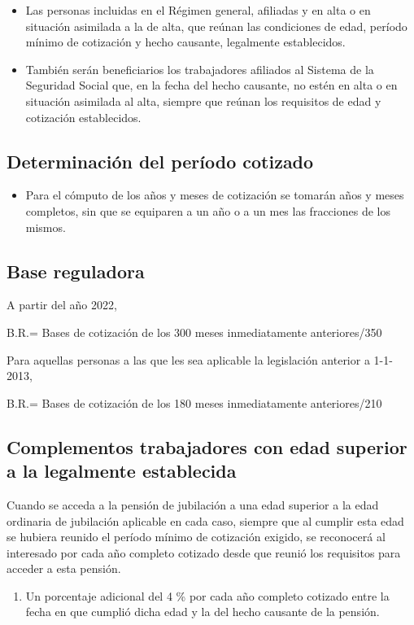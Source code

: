 \documentclass{article}
\begin{document}
	\begin{itemize}
		\item Las personas incluidas en el Régimen general, afiliadas y en alta o en situación asimilada a la de alta, que reúnan las condiciones de edad, período mínimo de cotización y hecho causante, legalmente establecidos.
		\item También serán beneficiarios los trabajadores afiliados al Sistema de la Seguridad Social que, en la fecha del hecho causante, no estén en alta o en situación asimilada al alta, siempre que reúnan los requisitos de edad y cotización establecidos.
	\end{itemize}
	
	\subsection*{Determinación del período cotizado}
	
	\begin{itemize}
		\item Para el cómputo de los años y meses de cotización se tomarán años y meses completos, sin que se equiparen a un año o a un mes las fracciones de los mismos.
	\end{itemize}
	
	\subsection*{Base reguladora}
	
	A partir del año 2022,
	
	B.R.= Bases de cotización de los 300 meses inmediatamente anteriores/350
	
	Para aquellas personas a las que les sea aplicable la legislación anterior a 1-1-2013,
	
	B.R.= Bases de cotización de los 180 meses inmediatamente anteriores/210
	
	\subsection*{Complementos trabajadores con edad superior a la legalmente establecida}
	
	Cuando se acceda a la pensión de jubilación a una edad superior a la edad ordinaria de jubilación aplicable en cada caso, siempre que al cumplir esta edad se hubiera reunido el período mínimo de cotización exigido, se reconocerá al interesado por cada año completo cotizado desde que reunió los requisitos para acceder a esta pensión.
	
	\begin{enumerate}
		\item Un porcentaje adicional del 4 \% por cada año completo cotizado entre la fecha en que cumplió dicha edad y la del hecho causante de la pensión.
	\end{enumerate}
	
\end{document}

